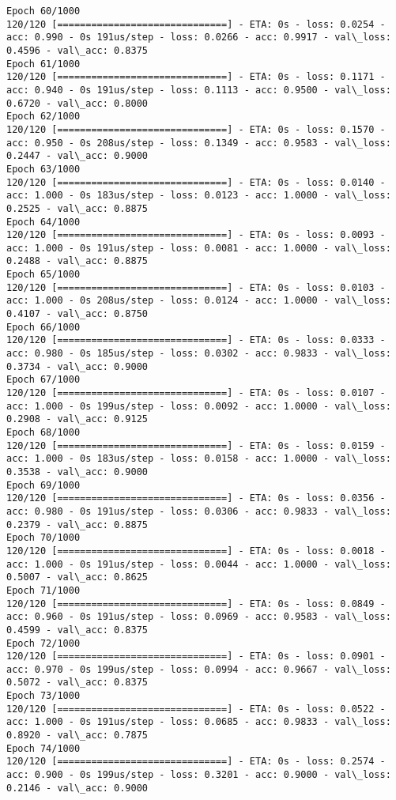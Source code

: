\documentclass[11pt]{article}
\begin{document}
\begin{Verbatim}[commandchars=\\\{\}]
Epoch 60/1000
120/120 [==============================] - ETA: 0s - loss: 0.0254 - acc: 0.990 - 0s 191us/step - loss: 0.0266 - acc: 0.9917 - val\_loss: 0.4596 - val\_acc: 0.8375
Epoch 61/1000
120/120 [==============================] - ETA: 0s - loss: 0.1171 - acc: 0.940 - 0s 191us/step - loss: 0.1113 - acc: 0.9500 - val\_loss: 0.6720 - val\_acc: 0.8000
Epoch 62/1000
120/120 [==============================] - ETA: 0s - loss: 0.1570 - acc: 0.950 - 0s 208us/step - loss: 0.1349 - acc: 0.9583 - val\_loss: 0.2447 - val\_acc: 0.9000
Epoch 63/1000
120/120 [==============================] - ETA: 0s - loss: 0.0140 - acc: 1.000 - 0s 183us/step - loss: 0.0123 - acc: 1.0000 - val\_loss: 0.2525 - val\_acc: 0.8875
Epoch 64/1000
120/120 [==============================] - ETA: 0s - loss: 0.0093 - acc: 1.000 - 0s 191us/step - loss: 0.0081 - acc: 1.0000 - val\_loss: 0.2488 - val\_acc: 0.8875
Epoch 65/1000
120/120 [==============================] - ETA: 0s - loss: 0.0103 - acc: 1.000 - 0s 208us/step - loss: 0.0124 - acc: 1.0000 - val\_loss: 0.4107 - val\_acc: 0.8750
Epoch 66/1000
120/120 [==============================] - ETA: 0s - loss: 0.0333 - acc: 0.980 - 0s 185us/step - loss: 0.0302 - acc: 0.9833 - val\_loss: 0.3734 - val\_acc: 0.9000
Epoch 67/1000
120/120 [==============================] - ETA: 0s - loss: 0.0107 - acc: 1.000 - 0s 199us/step - loss: 0.0092 - acc: 1.0000 - val\_loss: 0.2908 - val\_acc: 0.9125
Epoch 68/1000
120/120 [==============================] - ETA: 0s - loss: 0.0159 - acc: 1.000 - 0s 183us/step - loss: 0.0158 - acc: 1.0000 - val\_loss: 0.3538 - val\_acc: 0.9000
Epoch 69/1000
120/120 [==============================] - ETA: 0s - loss: 0.0356 - acc: 0.980 - 0s 191us/step - loss: 0.0306 - acc: 0.9833 - val\_loss: 0.2379 - val\_acc: 0.8875
Epoch 70/1000
120/120 [==============================] - ETA: 0s - loss: 0.0018 - acc: 1.000 - 0s 191us/step - loss: 0.0044 - acc: 1.0000 - val\_loss: 0.5007 - val\_acc: 0.8625
Epoch 71/1000
120/120 [==============================] - ETA: 0s - loss: 0.0849 - acc: 0.960 - 0s 191us/step - loss: 0.0969 - acc: 0.9583 - val\_loss: 0.4599 - val\_acc: 0.8375
Epoch 72/1000
120/120 [==============================] - ETA: 0s - loss: 0.0901 - acc: 0.970 - 0s 199us/step - loss: 0.0994 - acc: 0.9667 - val\_loss: 0.5072 - val\_acc: 0.8375
Epoch 73/1000
120/120 [==============================] - ETA: 0s - loss: 0.0522 - acc: 1.000 - 0s 191us/step - loss: 0.0685 - acc: 0.9833 - val\_loss: 0.8920 - val\_acc: 0.7875
Epoch 74/1000
120/120 [==============================] - ETA: 0s - loss: 0.2574 - acc: 0.900 - 0s 199us/step - loss: 0.3201 - acc: 0.9000 - val\_loss: 0.2146 - val\_acc: 0.9000

\end{Verbatim}
\end{document}
